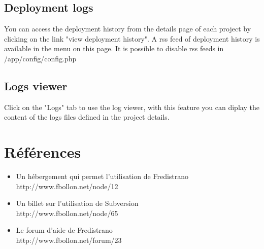 \documentclass[12pt,a4paper]{report}
\begin{document}
\section{Deployment logs}
You can access the deployment history from the details page of each project by clicking on the link "view deployment history". A rss feed of deployment history is available in the menu on this page. It is possible to disable rss feeds in /app/config/config.php 

\section{Logs viewer}
Click on the "Logs" tab to use the log viewer, with this feature you can diplay the content of the logs files defined in the project details.

\chapter{Références}
\begin{itemize}
\item Un hébergement qui permet l'utilisation de Fredistrano \\ http://www.fbollon.net/node/12 \\
\item Un billet sur l'utilisation de Subversion \\ http://www.fbollon.net/node/65 \\
\item Le forum d'aide de Fredistrano \\ http://www.fbollon.net/forum/23
\end{itemize}
\end{document}
